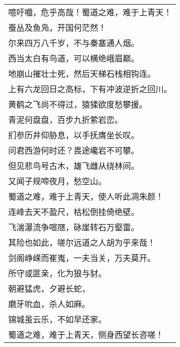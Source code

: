 \noindent\begin{minipage}{\linewidth}
  \vskip-3pt\begin{table}[H]
    \centering
    \begin{tabular}{@{}l@{}}
噫吁嚱，危乎高哉！蜀道之难，难于上青天！\\
蚕丛及鱼凫，开国何茫然！\\
尔来四万八千岁，不与秦塞通人烟。\\
西当太白有鸟道，可以横绝峨眉巅。\\
地崩山摧壮士死，然后天梯石栈相钩连。\\
上有六龙回日之高标，下有冲波逆折之回川。\\
黄鹤之飞尚不得过，猿猱欲度愁攀援。\\
青泥何盘盘，百步九折萦岩峦。\\
扪参历井仰胁息，以手抚膺坐长叹。\\
问君西游何时还？畏途巉岩不可攀。\\
但见悲鸟号古木，雄飞雌从绕林间。\\
又闻子规啼夜月，愁空山。\\
蜀道之难，难于上青天，使人听此凋朱颜！\\
连峰去天不盈尺，枯松倒挂倚绝壁。\\
飞湍瀑流争喧豗，砯崖转石万壑雷。\\
其险也如此，嗟尔远道之人胡为乎来哉！\\
剑阁峥嵘而崔嵬，一夫当关，万夫莫开。\\
所守或匪亲，化为狼与豺。\\
朝避猛虎，夕避长蛇，\\
磨牙吮血，杀人如麻。\\
锦城虽云乐，不如早还家。\\
蜀道之难，难于上青天，侧身西望长咨嗟！
    \end{tabular}
  \end{table}
\end{minipage}
\vspace{1cm}


